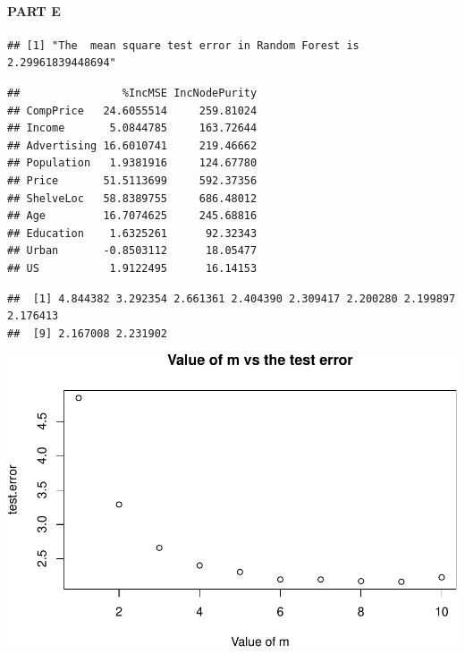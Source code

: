 \documentclass[
]{article}
\begin{document}
\hypertarget{part-e-2}{%
\paragraph{\texorpdfstring{{PART E}}{PART E}}\label{part-e-2}}

\begin{verbatim}
## [1] "The  mean square test error in Random Forest is 2.29961839448694"
\end{verbatim}

\begin{verbatim}
##                %IncMSE IncNodePurity
## CompPrice   24.6055514     259.81024
## Income       5.0844785     163.72644
## Advertising 16.6010741     219.46662
## Population   1.9381916     124.67780
## Price       51.5113699     592.37356
## ShelveLoc   58.8389755     686.48012
## Age         16.7074625     245.68816
## Education    1.6325261      92.32343
## Urban       -0.8503112      18.05477
## US           1.9122495      16.14153
\end{verbatim}

\begin{verbatim}
##  [1] 4.844382 3.292354 2.661361 2.404390 2.309417 2.200280 2.199897 2.176413
##  [9] 2.167008 2.231902
\end{verbatim}

\begin{center}\includegraphics{Disha_Gandhi_Take_Home_Exam_PDF_files/figure-latex/unnamed-chunk-79-1} \end{center}
\end{document}
